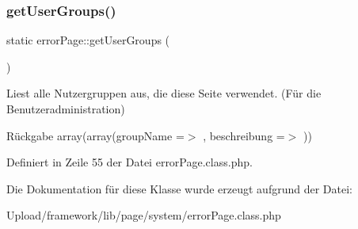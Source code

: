 \subsubsection{\texorpdfstring{get\+User\+Groups()}{getUserGroups()}}
{\footnotesize\ttfamily static error\+Page\+::get\+User\+Groups (\begin{DoxyParamCaption}{ }\end{DoxyParamCaption})\hspace{0.3cm}{\ttfamily [static]}}

Liest alle Nutzergruppen aus, die diese Seite verwendet. (Für die Benutzeradministration) \begin{DoxyReturn}{Rückgabe}
array(array(\textquotesingle{}group\+Name\textquotesingle{} =$>$ \textquotesingle{}\textquotesingle{}, \textquotesingle{}beschreibung\textquotesingle{} =$>$ \textquotesingle{}\textquotesingle{})) 
\end{DoxyReturn}


Definiert in Zeile 55 der Datei error\+Page.\+class.\+php.



Die Dokumentation für diese Klasse wurde erzeugt aufgrund der Datei\+:\begin{DoxyCompactItemize}
\item 
Upload/framework/lib/page/system/error\+Page.\+class.\+php\end{DoxyCompactItemize}
